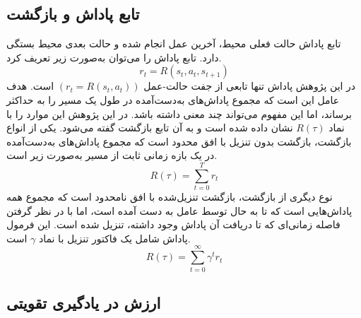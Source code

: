 \subsection{تابع پاداش و بازگشت}
تابع پاداش حالت فعلی محیط، آخرین عمل انجام شده و حالت بعدی محیط بستگی دارد. تابع پاداش را می‌توان به‌صورت زیر تعریف کرد.
\begin{equation}
	r_t = R(s_t, a_t, s_{t+1})
\end{equation}
در این پژوهش پاداش تنها تابعی از جفت حالت-عمل \((r_t = R(s_t, a_t))\) است.
هدف عامل این است که مجموع پاداش‌های به‌دست‌آمده در طول یک مسیر را به حداکثر برساند، اما این مفهوم می‌تواند چند معنی داشته باشد. در این پژوهش این موارد را با نماد \(R(\tau)\) نشان داده‌ شده است و به آن تابع بازگشت
 گفته می‌شود.
یکی از انواع بازگشت، بازگشت بدون تنزیل با افق محدود
 است که مجموع پاداش‌های به‌دست‌آمده در یک بازه زمانی ثابت از مسیر به‌صورت زیر است.
 \begin{equation}
 	R(\tau) = \sum_{t = 0}^T r_t
 \end{equation}
نوع دیگری از بازگشت، بازگشت تنزیل‌شده با افق نامحدود
 است که مجموع همه پاداش‌هایی است که تا به حال توسط عامل به دست آمده است، اما با در نظر گرفتن فاصله زمانی‌ای که تا دریافت آن پاداش وجود داشته، تنزیل
  شده است. این فرمول پاداش شامل یک فاکتور تنزیل
   با نماد \(\gamma\) است.
    \begin{equation}
   	R(\tau) = \sum_{t = 0}^{\infty} \gamma^t r_t
   \end{equation}
   
   
   
 \subsection{ ارزش در یادگیری تقویتی}
   
